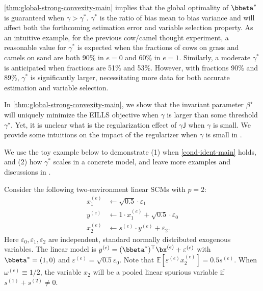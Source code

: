 \documentclass[10pt]{article}
\numberwithin{equation}{section}
\newcommand{\aosversion}[2]{\iftoggle{vaos}{#1}{#2}}
\newcommand{\blue}[1]{{\color{blue} #1}}
\begin{document}
{\begin{remark} 
\cref{thm:global-strong-convexity-main} implies that the global optimality of $\bbeta^*$ is guaranteed when $\gamma > \gamma^*$. $\gamma^*$ is the ratio of bias mean to bias variance and will affect both the forthcoming estimation error and variable selection property. As an intuitive example, for the previous cow/camel thought experiment, a reasonable value for $\gamma^*$ is expected when the fractions of cows on grass and camels on sand are both 90\% in $e=0$ and 60\% in $e=1$. Similarly, a moderate $\gamma^*$ is anticipated when fractions are 51\% and 53\%. However, with fractions 90\% and 89\%, $\gamma^*$ is significantly larger, necessitating more data for both accurate estimation and variable selection. 
\end{remark}

\begin{remark}
In \cref{thm:global-strong-convexity-main}, we show that the invariant parameter $\beta^\star$ will uniquely minimize the EILLS objective when $\gamma$ is larger than some threshold $\gamma^\star$. Yet, it is unclear what is the regularization effect of $\gamma \mathsf{J}$ when $\gamma$ is small. We provide some intuitions on the impact of the regularizer when $\gamma$ is small in \aosversion{Appendix~\blue{D.8}}{\cref{sec:small-gamma}}. 
\end{remark}


We use the toy example below to demonstrate (1) when \cref{cond-ident-main} holds, and (2) how $\gamma^*$ scales in a concrete model, and leave more examples and discussions in \aosversion{Appendix~\blue{A.4}}{\cref{sec:moreex}}.

\begin{example}
\label{ex-h-de}
    Consider the following two-environment linear SCMs with $p=2$:
    \begin{align*}
        x^{(e)}_1 &\gets \sqrt{0.5} \cdot \varepsilon_1 \\
        y^{(e)} &\gets 1\cdot x^{(e)}_1 + \sqrt{0.5} \cdot \varepsilon_0 \\
        x^{(e)}_2 &\gets  {s^{(e)}} \cdot y^{(e)} + \varepsilon_2.  
    \end{align*} Here $\varepsilon_0, \varepsilon_1, \varepsilon_2$ are independent, standard normally distributed exogenous variables. The linear model is $y^{(e)} = (\bbeta^*)^\top \bx^{(e)} + \varepsilon^{(e)}$ with $\bbeta^*=(1,0)$ and $\varepsilon^{(e)} = \sqrt{0.5} \varepsilon_0$. Note that $\mathbb{E}[\varepsilon^{(e)} x_2^{(e)}] = 0.5 s^{(e)}$. When $\omega^{(e)}\equiv 1/2$, the variable $x_2$ will be a pooled linear spurious variable if $s^{(1)}+s^{(2)} \neq 0$. 
    

\end{example}}
\end{document}
